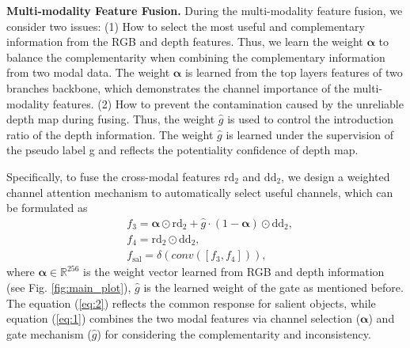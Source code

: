 \documentclass[journal]{IEEEtran}
\begin{document}
\indent\textbf{Multi-modality Feature Fusion.}
During the multi-modality feature fusion, we consider two issues:
(1) How to select the most useful and complementary information from the RGB and depth features. Thus, we learn the weight $\bm{\alpha}$ to balance the complementarity when combining the complementary information from two modal data. The weight $\bm{\alpha}$ is learned from the top layers features of two branches backbone, which demonstrates the channel importance of the multi-modality features.
(2) How to prevent the contamination caused by the unreliable depth map during fusing. Thus, the weight $\hat{g}$ is used to control the introduction ratio of the depth information. The weight $\hat{g}$ is learned under the supervision of the pseudo label g and reflects the potentiality confidence of depth map.

Specifically, to fuse the cross-modal features $\mathrm{rd}_2$ and $\mathrm{dd}_2$, we design a weighted channel attention mechanism to automatically select useful channels, which can be formulated as
\begin{align}
&f_3 = \bm{\alpha} \odot \mathrm{rd}_2 + \hat{g} \cdot (1 - \bm{\alpha}) \odot \mathrm{dd}_2, \label{eq:1}\\
&f_4 = \mathrm{rd}_2 \odot \mathrm{dd}_2, \label{eq:2}\\
&f_\mathrm{sal} = \delta(conv([f_3, f_4])),
\end{align}
where $\bm{\alpha} \in \mathbb{R}^{256}$ is the weight vector learned from RGB and depth information (see Fig. \ref{fig:main_plot}), $\hat{g}$ is the learned weight of the gate as mentioned before. The equation (\ref{eq:2}) reflects the common response for salient objects, while equation (\ref{eq:1}) combines the two modal features via channel selection ($\bm{\alpha}$) and gate mechanism ($\hat{g}$) for considering the complementarity and inconsistency.
\end{document}
